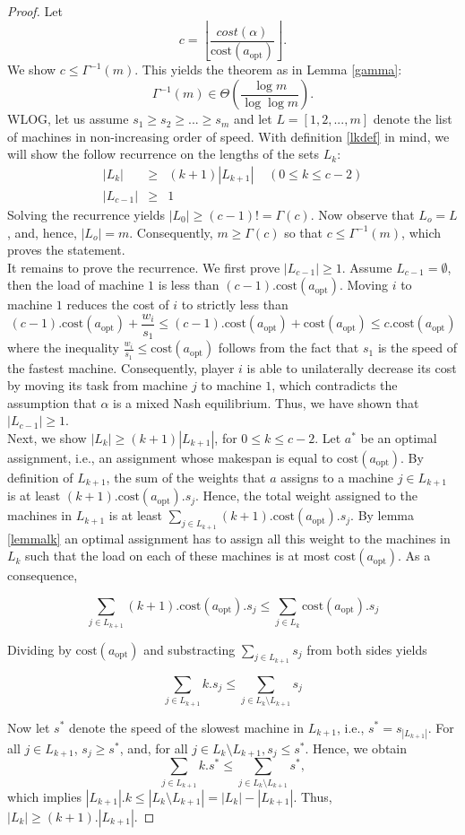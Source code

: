 \documentclass[a4paper,11pt]{article}
\newcommand{\cost}{\text{cost}}
\newcommand{\opt}{\text{opt}}
\newcommand{\copt}{\cost(a_{\opt})}
\begin{document}
\begin{proof}
Let $$c = \left\lfloor\frac{cost(\alpha)}{\cost(a_{\opt})}\right\rfloor.$$
We show $c \leq \Gamma^{-1}(m)$. This yields the theorem as in Lemma \ref{gamma}:
$$ \Gamma^{-1}(m) \in \Theta\left(\frac{\log m}{\log \log m}\right).$$
WLOG, let us assume $s_1 \geq s_2 \geq ... \geq s_m$ and let $L = [1,2,...,m]$ denote the list of machines in non-increasing order of speed. With definition \ref{lkdef} in mind, we will show the follow recurrence on the lengths of the sets $L_k$:
\begin{eqnarray*}
  |L_k| &\geq& (k+1)|L_{k+1}|  \;\;\; \; (0\leq k \leq c-2)\\
  |L_{c-1}| &\geq& 1
\end{eqnarray*}
Solving the recurrence yields $|L_0| \geq (c-1)! = \Gamma(c)$. Now observe that $L_o = L$, and, hence, $|L_o| = m$. Consequently, $m \geq \Gamma(c)$ so that $c \leq \Gamma^{-1}(m)$, which proves the statement.\\

It remains to prove the recurrence. We first prove $|L_{c-1}| \geq 1$. Assume $L_{c-1} = \emptyset$, then the load of machine $1$ is less than $(c-1).\copt$. Moving $i$ to machine $1$ reduces the cost of $i$ to strictly less than
$$(c-1).\copt+\frac{w_i}{s_1} \leq (c-1).\copt + \copt \leq c.\copt$$
where the inequality $\frac{w_i}{s_1} \leq \copt$ follows from the fact that $s_1$ is the speed of the fastest machine. Consequently, player $i$ is able to unilaterally decrease its cost by moving its task from machine $j$ to machine $1$, which contradicts the assumption that $\alpha$ is a mixed Nash equilibrium. Thus, we have shown that $|L_{c-1}| \geq 1$.\\

Next, we show $|L_k| \geq (k+1)|L_{k+1}|$, for $0\leq k\leq c-2$. Let $a^*$ be an optimal assignment, i.e., an assignment whose makespan is equal to $\copt$. By definition of $L_{k+1}$, the sum of the weights that $a$ assigns to a machine $j \in L_{k+1}$ is at least $(k+1).\copt.s_j$. Hence, the total weight assigned to the machines in $L_{k+1}$ is at least $\sum_{j\in L_{k+1}}(k+1).\copt.s_j$. By lemma \ref{lemmalk} an optimal assignment has to assign all this weight to the machines in $L_k$ such that the load on each of these machines is at most $\copt$. As a consequence,

$$\displaystyle\sum_{j\in L_{k+1}}(k+1).\copt.s_j \leq \displaystyle\sum_{j\in L_k}\copt.s_j$$

Dividing by $\copt$ and substracting $\sum_{j\in L_{k+1}}s_j$ from both sides yields

$$\displaystyle\sum_{j\in L_{k+1}}k.s_j \leq \displaystyle\sum_{j\in L_k\setminus L_{k+1}}s_j$$

Now let $s^*$ denote the speed of the slowest machine in $L_{k+1}$, i.e., $s^*=s_{|L_{k+1}|}$. For all $j \in L_{k+1}$, $s_j\geq s^*$, and, for all $j \in L_k\setminus L_{k+1}, s_j\leq s^*$. Hence, we obtain
$$\displaystyle\sum_{j\in L_{k+1}}k.s^* \leq \sum_{j\in L_k\setminus L_{k+1}}s^*,$$
which implies $|L_{k+1}|.k \leq |L_k\setminus L_{k+1}| = |L_k|-|L_{k+1}|$. Thus, $|L_k| \geq (k+1).|L_{k+1}|$.
\end{proof}
\end{document}
